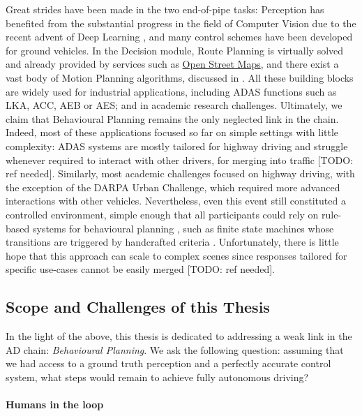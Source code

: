 Great strides have been made in the two end-of-pipe tasks: Perception has benefited from the substantial progress in the field of Computer Vision due to the recent advent of Deep Learning \citep[surveyed in][]{janai2017computer}, and many control schemes \citep[surveyed in][]{Polack2018} have been developed for ground vehicles. In the Decision module, Route Planning is virtually solved and already provided by services such as \href{https://wiki.openstreetmap.org/wiki/Routing}{Open Street Maps}, and there exist a vast body of Motion Planning algorithms, discussed in . All these building blocks are widely used for industrial applications, including \gls{ADAS} functions such as \gls{LKA}, \gls{ACC}, \gls{AEB} or \gls{AES}; and in academic research challenges. Ultimately, we claim that Behavioural Planning remains the only neglected link in the chain. Indeed, most of these applications focused so far on simple settings with little complexity: \gls{ADAS} systems are mostly tailored for highway driving and struggle whenever required to interact with other drivers, \eg for merging into traffic [TODO: ref needed]. Similarly, most academic challenges focused on highway driving, with the exception of the DARPA Urban Challenge, which required more advanced interactions with other vehicles. Nevertheless, even this event still constituted a controlled environment, simple enough that all participants could rely on rule-based systems for behavioural planning \citep{Buehler2009}, such as finite state machines whose transitions are triggered by handcrafted criteria \citep[\eg][]{Baker2008}. Unfortunately, there is little hope that this approach can scale to complex scenes since responses tailored for specific use-cases cannot be easily merged [TODO: ref needed].

\subsection{Scope and Challenges of this Thesis}
\label{sec:scopes-and-challenges}

In the light of the above, this thesis is dedicated to addressing a weak link in the \gls{AD} chain: \emph{Behavioural Planning}.  We ask the following question: assuming that we had access to a ground truth perception and a perfectly accurate control system, what steps would remain to achieve fully autonomous driving?


\paragraph{Humans in the loop}

